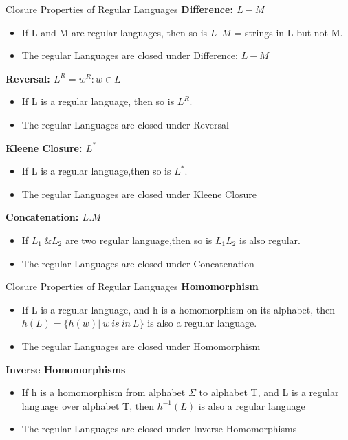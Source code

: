 \documentclass{beamer}
\begin{document}
\begin{frame}{Closure Properties of Regular Languages}
	\textbf{Difference: $L - M$}
	\begin{itemize}
		\item If L and M are regular languages, then 
		so is $L – M$ = strings in L but not M.
		\item The regular Languages are closed under Difference: $L - M$
	\end{itemize}
	\textbf{Reversal: $L^R = {w^R : w \in L}$}
	\begin{itemize}
		\item If L is a regular language,
		then so is $L^R$.
		\item The regular Languages are closed under Reversal
	\end{itemize}
	\textbf{Kleene Closure: $L^*$}
	\begin{itemize}
		\item If L is a regular language,then so is $L^*$.
		\item The regular Languages are closed under  Kleene Closure
	\end{itemize}
\textbf{Concatenation: $L.M$}
\begin{itemize}
	\item If $L_1\ \& L_2 $ are two regular language,then so is $L_1L_2$ is also regular.
	\item The regular Languages are closed under  Concatenation
\end{itemize}
\end{frame}
\begin{frame}{Closure Properties of Regular Languages}
	\textbf{Homomorphism}
	\begin{itemize}
		\item If L is a regular language, and h is a 
		homomorphism on its alphabet, then $h(L)= \{h(w) \big|\  w\  is\  in\  L\}$ is also a regular 
		language.
		\item The regular Languages are closed under Homomorphism
	\end{itemize}
\textbf{Inverse Homomorphisms}
\begin{itemize}
	\item If h is a homomorphism from alphabet $\Sigma$ to alphabet	T, and L is a regular language over
	alphabet T, then $h^{-1}(L)$ is also a regular language
	\item The regular Languages are closed under Inverse Homomorphisms
\end{itemize}
\end{frame}
\end{document}
